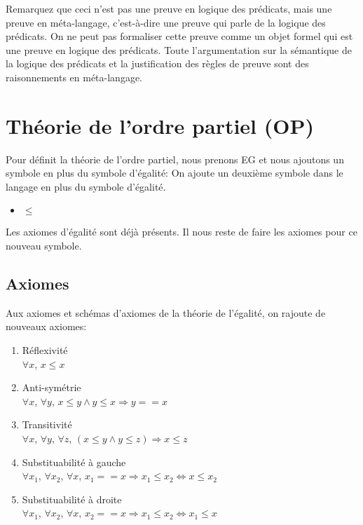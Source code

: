 \vspace{\baselineskip}
Remarquez que ceci n'est pas une preuve en logique des prédicats, mais une preuve en méta-langage, c'est-à-dire
une preuve qui parle de la logique des prédicats.
On ne peut pas formaliser cette preuve comme un objet formel qui est une preuve en logique des prédicats.
Toute l'argumentation sur la sémantique de la logique des prédicats et la justification des règles de preuve
sont des raisonnements en méta-langage.

\section{Théorie de l'ordre partiel (OP)}

Pour définit la théorie de l'ordre partiel, nous prenons EG et nous ajoutons un symbole en
plus du symbole d'égalité:
On ajoute un deuxième symbole dans le langage en plus du symbole d'égalité.
\begin{itemize}
	\item $\leq$
\end{itemize}
Les axiomes d'égalité sont déjà présents.
Il nous reste de faire les axiomes pour ce nouveau symbole.

\subsection{Axiomes} 

Aux axiomes et schémas d'axiomes de la théorie de l'égalité, on rajoute de nouveaux axiomes:
\begin{enumerate}
\item Réflexivité \\$\forall x$, $x\leq x$
\item Anti-symétrie \\$\forall x$, $\forall y$, $ x\leq y \land y\leq x\Rightarrow y==x$
\item Transitivité \\$\forall x$, $\forall y$, $\forall z$, $(x\leq y \land y\leq z) \Rightarrow x\leq z$
\item Substituabilité à gauche \\$\forall x_{1}$, $\forall x_{2}$, $\forall x$,  $x_{1}==x \Rightarrow x_{1}\leq x_{2} \Leftrightarrow x \leq x_{2}$
\item Substituabilité à droite \\$\forall x_{1}$, $\forall x_{2}$, $\forall x$,  $x_{2}==x \Rightarrow x_{1}\leq x_{2} \Leftrightarrow x_{1} \leq x$
\end{enumerate}

